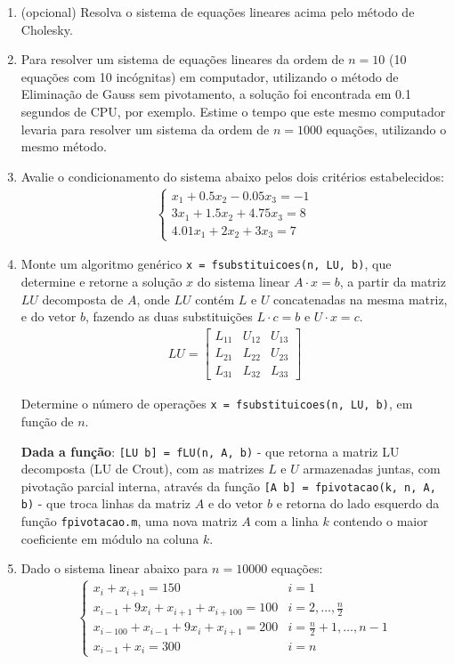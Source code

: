 \documentclass[12pt]{article}
\begin{document}
\begin{enumerate}[label=\textbf{\arabic*})]
\item (opcional) Resolva o sistema de equações lineares acima pelo método de
Cholesky.

\item Para resolver um sistema de equações lineares da ordem de $n = 10$ (10
equações com 10 incógnitas) em computador, utilizando o método de Eliminação de
Gauss sem pivotamento, a solução foi encontrada em 0.1 segundos de CPU, por
exemplo. Estime o tempo que este mesmo computador levaria para resolver um
sistema da ordem de $n = 1000$ equações, utilizando o mesmo método.

\item Avalie o condicionamento do sistema abaixo pelos dois critérios
estabelecidos:
\begin{align*}
\begin{cases}
x_1 + 0.5 x_2 - 0.05 x_3 = -1 \\
3 x_1 + 1.5 x_2 + 4.75 x_3 = 8 \\
4.01 x_1 + 2 x_2 + 3 x_3 = 7
\end{cases}
\end{align*}

\item Monte um algoritmo genérico \verb!x = fsubstituicoes(n, LU, b)!, que
determine e retorne a solução $x$ do sistema linear $A \cdot x = b$, a partir da
matriz $LU$ decomposta de $A$, onde $LU$ contém $L$ e $U$ concatenadas na mesma
matriz, e do vetor $b$, fazendo as duas substituições $L \cdot c = b$ e $U \cdot
x = c$.
\begin{align*}
LU = \begin{bmatrix}
L_{11} & U_{12} & U_{13} \\
L_{21} & L_{22} & U_{23} \\
L_{31} & L_{32} & L_{33}
\end{bmatrix}
\end{align*}

Determine o número de operações \verb!x = fsubstituicoes(n, LU, b)!, em função
de $n$.

\textbf{Dada a função}: \verb![LU b] = fLU(n, A, b)! - que retorna a matriz LU
decomposta (LU de Crout), com as matrizes $L$ e $U$ armazenadas juntas, com
pivotação parcial interna, através da função
\verb![A b] = fpivotacao(k, n, A, b)! - que troca linhas da matriz $A$ e do
vetor $b$ e retorna do lado esquerdo da função \verb!fpivotacao.m!, uma nova
matriz $A$ com a linha $k$ contendo o maior coeficiente em módulo na coluna $k$.

\item Dado o sistema linear abaixo para $n = 10000$ equações:
\begin{align*}
\begin{cases}
x_i + x_{i + 1} = 150 &
i = 1 \\
x_{i - 1} + 9x_i + x_{i + 1} + x_{i + 100} = 100 &
i = 2, \dots, \frac{n}{2} \\
x_{i - 100} + x_{i - 1} + 9x_i + x_{i + 1} = 200 &
i = \frac{n}{2} + 1, \dots, n - 1 \\
x_{i - 1} + x_i = 300 &
i = n
\end{cases}
\end{align*}


\end{enumerate}
\end{document}
